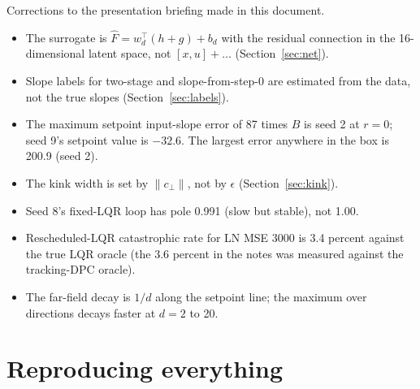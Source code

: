 \documentclass[11pt]{article}
\begin{document}
Corrections to the presentation briefing made in this document.
\begin{itemize}
\item The surrogate is $\hat F=w_d^\top(h+g)+b_d$ with the residual connection in the 16-dimensional latent space, not $[x,u]+\dots$ (Section~\ref{sec:net}).
\item Slope labels for two-stage and slope-from-step-0 are estimated from the data, not the true slopes (Section~\ref{sec:labels}).
\item The maximum setpoint input-slope error of 87 times $B$ is seed 2 at $r=0$; seed 9's setpoint value is $-32.6$. The largest error anywhere in the box is 200.9 (seed 2).
\item The kink width is set by $\|c_\perp\|$, not by $\epsilon$ (Section~\ref{sec:kink}).
\item Seed 8's fixed-LQR loop has pole 0.991 (slow but stable), not 1.00.
\item Rescheduled-LQR catastrophic rate for LN MSE 3000 is 3.4 percent against the true LQR oracle (the 3.6 percent in the notes was measured against the tracking-DPC oracle).
\item The far-field decay is $1/d$ along the setpoint line; the maximum over directions decays faster at $d=2$ to 20.
\end{itemize}

\section{Reproducing everything}\label{sec:repro}
\end{document}
